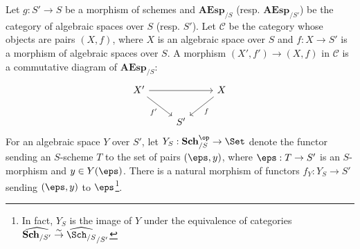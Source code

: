 Let $g:S'\to S$ be a morphism of schemes and $\mathbf{AEsp}_{/S}$ (resp. $\mathbf{AEsp}_{/S'}$) be the category of algebraic spaces over $S$ (resp. $S'$). Let $\mathcal{C}$ be the category whose objects are pairs $(X,f)$, where $X$ is an algebraic space over $S$ and $f:X\to S'$ is a morphism of algebraic spaces over $S$. A morphism $(X',f')\to (X,f)$ in $\mathcal{C}$ is a commutative diagram of $\mathbf{AEsp}_{/S}$:
\[\begin{tikzcd}
X'\ar[rd,swap,"f'"]\ar[rr]&&X\ar[ld,"f"]\\
&S'&
\end{tikzcd}\]
For an algebraic space $Y$ over $S'$, let $Y_S:\mathbf{Sch}_{/S}^{\op}\to\Set$ denote the functor sending an $S$-scheme $T$ to the set of pairs $(\eps,y)$, where $\eps:T\to S'$ is an $S$-morphism and $y\in Y(\eps)$. There is a natural morphism of functors $f_Y:Y_S\to S'$ sending $(\eps,y)$ to $\eps$\footnote{In fact, $Y_S$ is the image of $Y$ under the equivalence of categories $\widehat{\mathbf{Sch}_{/S'}}\stackrel{\sim}{\to} \widehat{\Sch_{/S}}_{/S'}$}.

